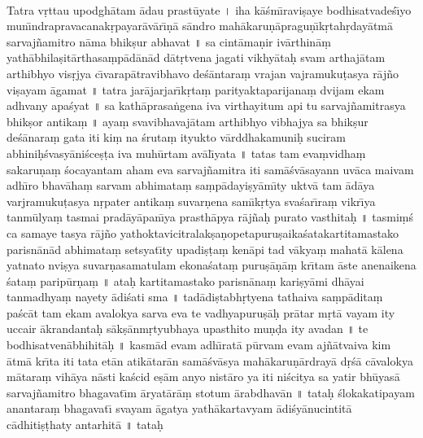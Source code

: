 \documentclass[a4paper, 11pt, oneside, french, landscape, twocolumn]{article}
\begin{document}
\paragraph{}
Tatra v\d{r}ttau upodgh\={a}tam \={a}dau prast\={u}yate \texthindi{।} iha k\={a}\'{s}m\={\i}ravi\d{s}aye bodhisatvade\'{s}\={\i}yo mun\={\i}ndrapravacanak\d{r}payar\={a}v\={a}r\={\i}\d{n}\={a} s\={a}ndro mah\={a}karu\d{n}\={a}pragu\d{n}\={\i}k\d{r}tah\d{r}day\={a}tm\={a} sarvaj\~{n}amitro n\={a}ma bhik\d{s}ur abhavat \texthindi{॥} sa cint\={a}ma\d{n}ir iv\={a}rthin\={a}\d{m} yath\={a}bhila\d{s}it\={a}rthasa\d{m}p\={a}d\={a}n\={a}d d\={a}t\d{r}tvena jagati vikhy\={a}ta\d{h} svam arthaj\={a}tam arthibhyo vis\d{r}jya c\={\i}varap\={a}travibhavo de\'{s}\={a}ntara\d{m} vrajan vajramuku\d{t}asya r\={a}j\~{n}o vi\d{s}ayam \={a}gamat \texthindi{॥} tatra jar\={a}jarjar\={\i}k\d{r}ta\d{m} parityaktaparijana\d{m} dvijam ekam adhvany apa\'{s}yat \texthindi{॥} sa kath\={a}prasa\.{n}gena iva virthayitum api tu sarvaj\~{n}amitrasya bhik\d{s}or antika\d{m} \texthindi{॥} aya\d{m} svavibhavaj\={a}tam arthibhyo vibhajya sa bhik\d{s}ur de\'{s}\={a}nara\d{m} gata iti ki\d{m} na \'{s}ruta\d{m} ityukto v\={a}rddhakamuni\d{h} suciram abhini\d{h}\'{s}vasy\={a}ni\'{s}ce\d{s}\d{t}a iva muh\={u}rtam av\={a}l\={\i}yata \texthindi{॥} tatas tam eva\d{m}vidha\d{m} sakaru\d{n}a\d{m} \'{s}ocayantam aham eva sarvaj\~{n}amitra iti sam\={a}\'{s}v\={a}sayann uv\={a}ca maivam adh\={\i}ro bhav\={a}ha\d{m} sarvam abhimata\d{m} sa\d{m}p\={a}dayi\d{s}y\={a}m\={\i}ty uktv\={a} tam \={a}d\={a}ya varjramuku\d{t}asya n\d{r}pater antika\d{m} suvar\d{n}ena sam\={\i}k\d{r}tya sva\'{s}ar\={\i}ra\d{m} vikr\={\i}ya tanm\={u}lya\d{m} tasmai prad\={a}y\={a}pan\={\i}ya prasth\={a}pya r\={a}j\~{n}a\d{h} purato vasthita\d{h} \texthindi{॥} tasmi\d{m}\'{s} ca samaye tasya r\={a}j\~{n}o yathoktavicitralak\d{s}a\d{n}opetapuru\d{s}aika\'{s}atakartitamastako parisn\={a}n\={a}d abhimata\d{m} setsyat\={\i}ty upadi\d{s}\d{t}a\d{m} ken\={a}pi tad v\={a}kya\d{m} mahat\={a} k\={a}lena yatnato nvi\d{s}ya suvar\d{n}asamatulam ekona\'{s}ata\d{m} puru\d{s}\={a}\d{n}\={a}\d{m} kr\={\i}tam \={a}ste anenaikena \'{s}ata\d{m} parip\={u}r\d{n}a\d{m} \texthindi{॥} ata\d{h} kartitamastako parisn\={a}na\d{m} kari\d{s}y\={a}mi dh\={a}yai tanmadhya\d{m} nayety \={a}di\'{s}ati sma \texthindi{॥} tad\={a}di\d{s}tabh\d{r}tyena tathaiva sa\d{m}p\={a}dita\d{m} pa\'{s}c\={a}t tam ekam avalokya sarva eva te vadhyapuru\d{s}\={a}\d{h} pr\={a}tar m\d{r}t\={a} vayam ity uccair \={a}krandanta\d{h} s\={a}k\d{s}\={a}nm\d{r}tyubhaya upasthito mu\d{n}\d{d}a ity avadan \texthindi{॥} te bodhisatven\={a}bhihit\={a}\d{h} \texthindi{॥} kasm\={a}d evam adh\={\i}rat\={a} p\={u}rvam evam aj\~{n}\={a}tvaiva kim \={a}tm\={a} kr\={\i}ta iti tata et\={a}n atik\={a}tar\={a}n sam\={a}\'{s}v\={a}sya mah\={a}karu\d{n}\={a}rdray\={a} d\d{r}\'{s}\={a} c\={a}valokya m\={a}tara\d{m} vih\={a}ya n\={a}sti ka\'{s}cid e\d{s}\={a}m anyo nist\={a}ro ya iti ni\'{s}citya sa yatir bh\={u}yas\={a} sarvaj\~{n}amitro bhagavat\={\i}m \={a}ryat\={a}r\={a}\d{m} stotum \={a}rabdhav\={a}n \texthindi{॥} tata\d{h} \'{s}lokakatipayam anantara\d{m} bhagavat\={\i} svayam \={a}gatya yath\={a}kartavyam \={a}di\'{s}y\={a}nucintit\={a} c\={a}dhiti\d{s}\d{t}haty antarhit\={a} \texthindi{॥} tata\d{h} 
\end{document}
